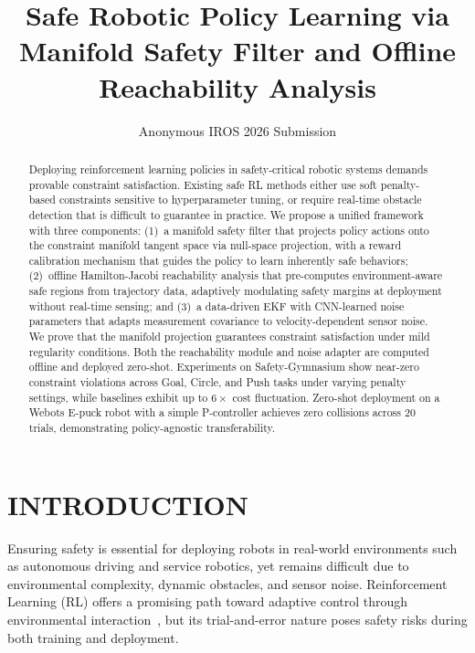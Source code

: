 \documentclass[letterpaper, 10 pt, conference]{ieeeconf}
\title{\LARGE \bf
Safe Robotic Policy Learning via Manifold Safety Filter and Offline Reachability Analysis
}
\author{Anonymous IROS 2026 Submission}
\begin{document}
\maketitle
\thispagestyle{empty}
\pagestyle{empty}

\begin{abstract}

Deploying reinforcement learning policies in safety-critical robotic systems demands provable constraint satisfaction. Existing safe RL methods either use soft penalty-based constraints sensitive to hyperparameter tuning, or require real-time obstacle detection that is difficult to guarantee in practice. We propose a unified framework with three components: (1)~a manifold safety filter that projects policy actions onto the constraint manifold tangent space via null-space projection, with a reward calibration mechanism that guides the policy to learn inherently safe behaviors; (2)~offline Hamilton-Jacobi reachability analysis that pre-computes environment-aware safe regions from trajectory data, adaptively modulating safety margins at deployment without real-time sensing; and (3)~a data-driven EKF with CNN-learned noise parameters that adapts measurement covariance to velocity-dependent sensor noise. We prove that the manifold projection guarantees constraint satisfaction under mild regularity conditions. Both the reachability module and noise adapter are computed offline and deployed zero-shot. Experiments on Safety-Gymnasium show near-zero constraint violations across Goal, Circle, and Push tasks under varying penalty settings, while baselines exhibit up to $6\times$ cost fluctuation. Zero-shot deployment on a Webots E-puck robot with a simple P-controller achieves zero collisions across 20 trials, demonstrating policy-agnostic transferability.

\end{abstract}

\section{INTRODUCTION}

Ensuring safety is essential for deploying robots in real-world environments such as autonomous driving and service robotics, yet remains difficult due to environmental complexity, dynamic obstacles, and sensor noise. Reinforcement Learning (RL) offers a promising path toward adaptive control through environmental interaction~\cite{gu2024saferl_survey}, but its trial-and-error nature poses safety risks during both training and deployment.
\end{document}
